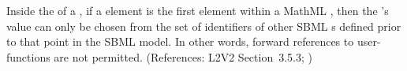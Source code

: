Inside the  of a \FunctionDefinition, if a
 element is the first element within a MathML
, then the 's value can only be chosen from
the set of identifiers of other SBML \FunctionDefinition{}s
defined prior to that point in the SBML model.  In other words,
forward references to user-functions are not permitted.
(References: L2V2 Section~3.5.3; )

